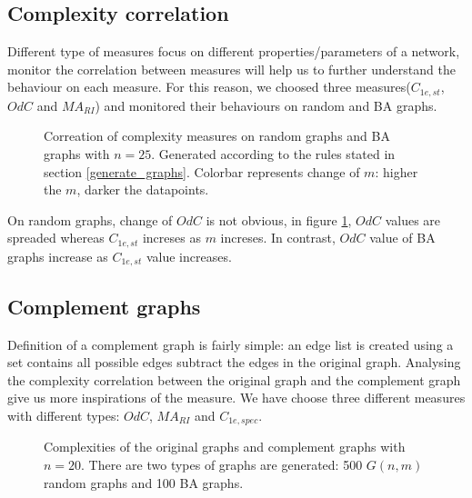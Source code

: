 \documentclass[12pt]{article}
\begin{document}
\subsection{Complexity correlation}
Different type of measures focus on different properties/parameters of a network, monitor the correlation between measures will help us to further understand the behaviour on each measure. For this reason, we choosed three measures($C_{1e,st}$,$OdC$ and $MA_{RI}$) and monitored their behaviours on random and BA graphs.\\
\begin{figure}[ht]
    \caption{Correation of complexity measures on random graphs and BA graphs with $n=25$. Generated according to the rules stated in section \ref{generate_graphs}. Colorbar represents change of $m$: higher the $m$, darker the datapoints.}
    \label{fig:correlation}
\end{figure}

\noindent
On random graphs, change of $OdC$ is not obvious, in figure \ref{fig:correlation}, $OdC$ values are spreaded whereas $C_{1e,st}$ increses as $m$ increses. In contrast, $OdC$ value of BA graphs increase as $C_{1e,st}$ value increases. 


\subsection{Complement graphs}
Definition of a complement graph is fairly simple: an edge list is created using a set contains all possible edges subtract the edges in the original graph. Analysing the complexity correlation between the original graph and the complement graph give us more inspirations of the measure. We have choose three different measures with different types: $OdC$, $MA_{RI}$ and $C_{1e,spec}$.
\begin{figure}[ht]
    \caption{Complexities of the original graphs and complement graphs with $n=20$. There are two types of graphs are generated: 500 $G(n,m)$ random graphs and 100 BA graphs.}
    \label{fig:complement}
\end{figure}
\end{document}
